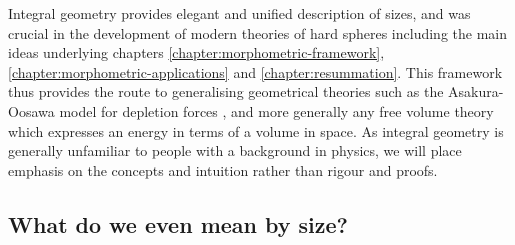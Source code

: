Integral geometry provides elegant and unified description of sizes, and was crucial in the development of modern theories of hard spheres including the main ideas underlying chapters \ref{chapter:morphometric-framework}, \ref{chapter:morphometric-applications} and \ref{chapter:resummation}.
This framework thus provides the route to generalising geometrical theories such as the Asakura-Oosawa model for depletion forces \cite{AsakuraJCP1954,AsakuraJPS1958}, and more generally any free volume theory which expresses an energy in terms of a volume in space.
As integral geometry is generally unfamiliar to people with a background in physics, we will place emphasis on the concepts and intuition rather than rigour and proofs.

\subsection{What do we even mean by size?}

